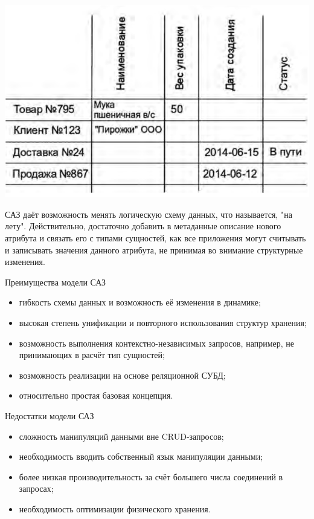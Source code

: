 \documentclass{beamer}
\begin{document}
\begin{frame}
\begin{center}
\includegraphics[scale=0.35]{images/eav-02.png}
\end{center}
САЗ даёт возможность менять логическую схему данных, что называется, "на лету".
Действительно, достаточно добавить в метаданные описание нового атрибута и связать его с типами сущностей, как все приложения могут считывать и записывать значения данного атрибута, не принимая во внимание структурные изменения. 
\end{frame}

\begin{frame} 
\begin{block}{Преимущества модели САЗ}
\begin{itemize}
\item гибкость схемы данных и возможность её изменения в динамике;
\item высокая степень унификации и повторного использования структур хранения;
\item возможность выполнения контекстно-независимых запросов, например, не принимающих в расчёт тип сущностей;
\item возможность реализации на основе реляционной СУБД;
\item относительно простая базовая концепция.
\end{itemize}
\end{block}
\begin{block}{Недостатки модели САЗ}
\begin{itemize}
\item сложность манипуляций данными вне CRUD-запросов;
\item необходимость вводить собственный язык манипуляции данными;
\item более низкая производительность за счёт большего числа соединений в запросах;
\item необходимость оптимизации физического хранения.
\end{itemize}
\end{block}
\end{frame} 
\end{document}
